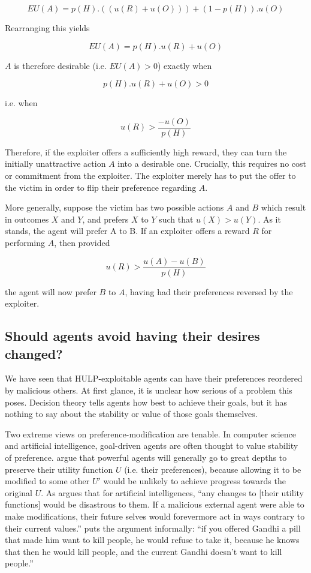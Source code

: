 \documentclass{article}
\begin{document}
\[EU(A) = p(H).((u(R)+u(O))) + (1-p(H)).u(O)\]

Rearranging this yields

\[EU(A) = p(H).u(R) + u(O)\]

\(A\) is therefore desirable (i.e. \(EU(A)>0\)) exactly when

\[p(H).u(R) + u(O) > 0\]

i.e. when

\[u(R) > \frac{-u(O)}{p(H)}\]

Therefore, if the exploiter offers a sufficiently high reward, they can turn the initially unattractive action \(A\) into a desirable one. Crucially, this requires no cost or commitment from the exploiter. The exploiter merely has to put the offer to the victim in order to flip their preference regarding \(A\).

More generally, suppose the victim has two possible actions \(A\) and \(B\) which result in outcomes \(X\) and \(Y\), and prefers \(X\) to \(Y\) such that \(u(X)>u(Y)\). As it stands, the agent will prefer A to B. If an exploiter offers a reward \(R\) for performing \(A\), then provided

\[u(R) > \frac{u(A)-u(B)}{p(H)}\]

the agent will now prefer \(B\) to \(A\), having had their preferences reversed by the exploiter.

\subsection{Should agents avoid having their desires changed?}

We have seen that HULP-exploitable agents can have their preferences reordered by malicious others. At first glance, it is unclear how serious of a problem this poses. Decision theory tells agents how best to achieve their goals, but it has nothing to say about the stability or value of those goals themselves.

Two extreme views on preference-modification are tenable. In computer science and artificial intelligence, goal-driven agents are often thought to value stability of preference. \citep{omohundro2008basic,bostrom2012will} argue that powerful agents will generally go to great depths to preserve their utility function \(U\) (i.e. their preferences), because allowing it to be modified to some other \(U'\) would be unlikely to achieve progress towards the original \(U\). As \citep{omohundro2008basic} argues that for artificial intelligences, ``any changes to [their utility functions] would be disastrous to them. If a malicious external agent were able to make modifications, their future selves would forevermore act in ways contrary to their current values.'' \citep{1_yudkowsky_2012} puts the argument informally: ``if you offered Gandhi a pill that made him want to kill people, he would refuse to take it, because he knows that then he would kill people, and the current Gandhi doesn't want to kill people.'' 
\end{document}
